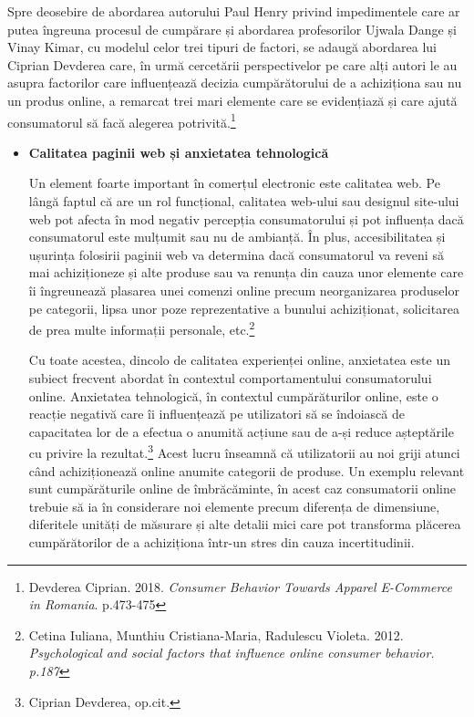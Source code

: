 \documentclass[a4paper, 12pt]{article}
\begin{document}
	\quad Spre deosebire de abordarea autorului Paul Henry privind impedimentele care ar putea îngreuna procesul de cumpărare și abordarea profesorilor Ujwala Dange și Vinay Kimar, cu modelul celor trei tipuri de factori, se adaugă abordarea lui Ciprian Devderea care, în urmă cercetării perspectivelor pe care alți autori le au asupra factorilor care influențează decizia cumpărătorului de a achiziționa sau nu un produs online, a remarcat trei mari elemente care se evidențiază și care ajută consumatorul să facă alegerea potrivită.\footnote{Devderea Ciprian. 2018. \textit{Consumer Behavior Towards Apparel E-Commerce in Romania}. p.473-475 }
	\begin{itemize}
		\item\textbf{Calitatea paginii web și anxietatea tehnologică} 
		
		\quad Un element foarte important în comerțul electronic este calitatea web. Pe lângă faptul că are un rol funcțional, calitatea web-ului sau designul site-ului web pot afecta în mod negativ percepția consumatorului și pot influența dacă consumatorul este mulțumit sau nu de ambianță. În plus, accesibilitatea și ușurința folosirii paginii web va determina dacă consumatorul va reveni să mai achiziționeze și alte produse sau va renunța din cauza unor elemente care îi îngreunează plasarea unei comenzi online precum neorganizarea produselor pe categorii, lipsa unor poze reprezentative a bunului achiziționat, solicitarea de prea multe informații personale, etc.\footnote{Cetina Iuliana, Munthiu Cristiana-Maria, Radulescu Violeta. 2012. \textit{Psychological and
		social factors that influence online consumer behavior. p.187}}
		
		\quad Cu toate acestea, dincolo de calitatea experienței online, anxietatea este un subiect frecvent abordat în contextul comportamentului consumatorului online. Anxietatea tehnologică, în contextul cumpărăturilor online, este o reacție negativă care îi influențează pe utilizatori să se îndoiască de capacitatea lor de a efectua o anumită acțiune sau de a-și reduce așteptările cu privire la rezultat.\footnote{Ciprian Devderea, op.cit.} Acest lucru înseamnă că utilizatorii au noi griji atunci când achiziționează online anumite categorii de produse. Un exemplu relevant sunt cumpărăturile online de îmbrăcăminte, în acest caz consumatorii online trebuie să ia în considerare noi elemente precum diferența de dimensiune, diferitele unități de măsurare și alte detalii mici care pot transforma plăcerea cumpărătorilor de a achiziționa într-un stres din cauza incertitudinii.
		

\end{itemize}
\end{document}
